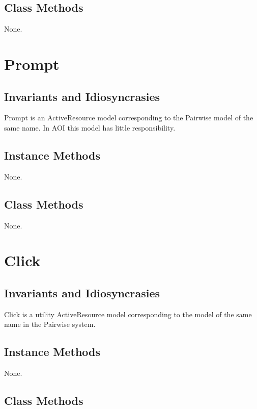 \documentclass[11pt]{book}
\begin{document}
\subsection{Class Methods}

None.





\section{Prompt}

\subsection{Invariants and Idiosyncrasies}

Prompt is an ActiveResource model corresponding to the Pairwise model of the same name.  In AOI this model has little responsibility.

\subsection{Instance Methods}

None.


\subsection{Class Methods}

None.



\section{Click}

\subsection{Invariants and Idiosyncrasies}

Click is a utility ActiveResource model corresponding to the model of the same name in the Pairwise system.

\subsection{Instance Methods}

None.

\subsection{Class Methods}
\end{document}
